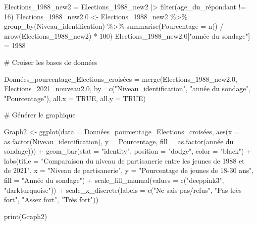 \documentclass[
  letterpaper,
  DIV=11,
  numbers=noendperiod]{scrartcl}
\newenvironment{Shaded}{\begin{snugshade}}{\end{snugshade}}
\newcommand{\AttributeTok}[1]{\textcolor[rgb]{0.40,0.45,0.13}{#1}}
\newcommand{\CommentTok}[1]{\textcolor[rgb]{0.37,0.37,0.37}{#1}}
\newcommand{\ConstantTok}[1]{\textcolor[rgb]{0.56,0.35,0.01}{#1}}
\newcommand{\DecValTok}[1]{\textcolor[rgb]{0.68,0.00,0.00}{#1}}
\newcommand{\FloatTok}[1]{\textcolor[rgb]{0.68,0.00,0.00}{#1}}
\newcommand{\FunctionTok}[1]{\textcolor[rgb]{0.28,0.35,0.67}{#1}}
\newcommand{\NormalTok}[1]{\textcolor[rgb]{0.00,0.23,0.31}{#1}}
\newcommand{\OtherTok}[1]{\textcolor[rgb]{0.00,0.23,0.31}{#1}}
\newcommand{\SpecialCharTok}[1]{\textcolor[rgb]{0.37,0.37,0.37}{#1}}
\newcommand{\StringTok}[1]{\textcolor[rgb]{0.13,0.47,0.30}{#1}}
\begin{document}
\begin{Shaded}
\begin{Highlighting}[]
\NormalTok{Elections\_1988\_new2 }\OtherTok{=}\NormalTok{ Elections\_1988\_new2 }\SpecialCharTok{|\textgreater{}} \FunctionTok{filter}\NormalTok{(age\_du\_répondant }\SpecialCharTok{!=} \DecValTok{16}\NormalTok{)}
\NormalTok{Elections\_1988\_new2}\FloatTok{.0} \OtherTok{\textless{}{-}}\NormalTok{ Elections\_1988\_new2 }\SpecialCharTok{\%\textgreater{}\%} \FunctionTok{group\_by}\NormalTok{(Niveau\_identification) }\SpecialCharTok{\%\textgreater{}\%} \FunctionTok{summarise}\NormalTok{(}\AttributeTok{Pourcentage =} \FunctionTok{n}\NormalTok{() }\SpecialCharTok{/} \FunctionTok{nrow}\NormalTok{(Elections\_1988\_new2) }\SpecialCharTok{*} \DecValTok{100}\NormalTok{)}
\NormalTok{Elections\_1988\_new2}\FloatTok{.0}\NormalTok{[}\StringTok{"année du sondage"}\NormalTok{] }\OtherTok{=} \DecValTok{1988}

\CommentTok{\# Croiser les bases de données}

\NormalTok{Données\_pourcentage\_Elections\_croisées }\OtherTok{=} \FunctionTok{merge}\NormalTok{(Elections\_1988\_new2}\FloatTok{.0}\NormalTok{, Elections\_2021\_nouveau2}\FloatTok{.0}\NormalTok{, }\AttributeTok{by =}\FunctionTok{c}\NormalTok{(}\StringTok{"Niveau\_identification"}\NormalTok{, }\StringTok{"année du sondage"}\NormalTok{, }\StringTok{"Pourcentage"}\NormalTok{), }\AttributeTok{all.x =} \ConstantTok{TRUE}\NormalTok{, }\AttributeTok{all.y =} \ConstantTok{TRUE}\NormalTok{)}

\CommentTok{\# Générer le graphique}

\NormalTok{Graph2 }\OtherTok{\textless{}{-}} \FunctionTok{ggplot}\NormalTok{(}\AttributeTok{data =}\NormalTok{ Données\_pourcentage\_Elections\_croisées, }\FunctionTok{aes}\NormalTok{(}\AttributeTok{x =} \FunctionTok{as.factor}\NormalTok{(Niveau\_identification), }\AttributeTok{y =}\NormalTok{ Pourcentage, }\AttributeTok{fill =} \FunctionTok{as.factor}\NormalTok{(}\StringTok{\textasciigrave{}}\AttributeTok{année du sondage}\StringTok{\textasciigrave{}}\NormalTok{))) }\SpecialCharTok{+} \FunctionTok{geom\_bar}\NormalTok{(}\AttributeTok{stat =} \StringTok{"identity"}\NormalTok{, }\AttributeTok{position =} \StringTok{"dodge"}\NormalTok{, }\AttributeTok{color =} \StringTok{"black"}\NormalTok{) }\SpecialCharTok{+} \FunctionTok{labs}\NormalTok{(}\AttributeTok{title =} \StringTok{"Comparaison du niveau de partisanerie entre les jeunes de 1988 et de 2021"}\NormalTok{, }\AttributeTok{x =} \StringTok{"Niveau de partisanerie"}\NormalTok{, }\AttributeTok{y =} \StringTok{"Pourcentage de jeunes de 18{-}30 ans"}\NormalTok{, }\AttributeTok{fill =} \StringTok{"Année du sondage"}\NormalTok{) }\SpecialCharTok{+} \FunctionTok{scale\_fill\_manual}\NormalTok{(}\AttributeTok{values =} \FunctionTok{c}\NormalTok{(}\StringTok{"deeppink3"}\NormalTok{, }\StringTok{"darkturquoise"}\NormalTok{)) }\SpecialCharTok{+} \FunctionTok{scale\_x\_discrete}\NormalTok{(}\AttributeTok{labels =} \FunctionTok{c}\NormalTok{(}\StringTok{"Ne sais pas/refus"}\NormalTok{, }\StringTok{"Pas très fort"}\NormalTok{, }\StringTok{"Assez fort"}\NormalTok{, }\StringTok{"Très fort"}\NormalTok{))}

\FunctionTok{print}\NormalTok{(Graph2)}
\end{Highlighting}
\end{Shaded}
\end{document}
